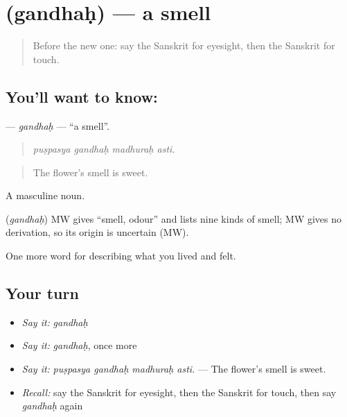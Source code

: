 \section[\texorpdfstring{\sk{गन्धः} (gandhaḥ)}{गन्धः (gandhaḥ)}]{ (gandhaḥ) — a smell}

\label{lesson:SA-C469-gandhah}



\begin{quote}
Before the new one: say the Sanskrit for eyesight, then the Sanskrit for touch.
\end{quote}

\subsection*{You'll want to know: }
\textbf{} — \emph{gandhaḥ} — \textquotedblleft{}a smell\textquotedblright{}.

\begin{quote}
   
\end{quote}

\begin{quote}
\emph{puṣpasya gandhaḥ madhuraḥ asti.}
\end{quote}

\begin{quote}
The flower's smell is sweet.
\end{quote}

A masculine noun.

\begin{cousinweb}
\textbf{} (\emph{gandhaḥ}) MW gives \textquotedblleft{}smell, odour\textquotedblright{} and lists nine kinds of smell; MW gives no derivation, so its origin is uncertain (MW).
\end{cousinweb}

\begin{grammarlens}[title={What you've built}]
One more word for describing what you lived and felt.
\end{grammarlens}

\subsection*{Your turn}
\begin{itemize}
\raggedright
  \item \emph{Say it:} \emph{gandhaḥ}
  \item \emph{Say it:} \emph{gandhaḥ}, once more
  \item \emph{Say it:} \emph{puṣpasya gandhaḥ madhuraḥ asti.} — The flower's smell is sweet.
  \item \emph{Recall:} say the Sanskrit for eyesight, then the Sanskrit for touch, then say \emph{gandhaḥ} again
\end{itemize}

